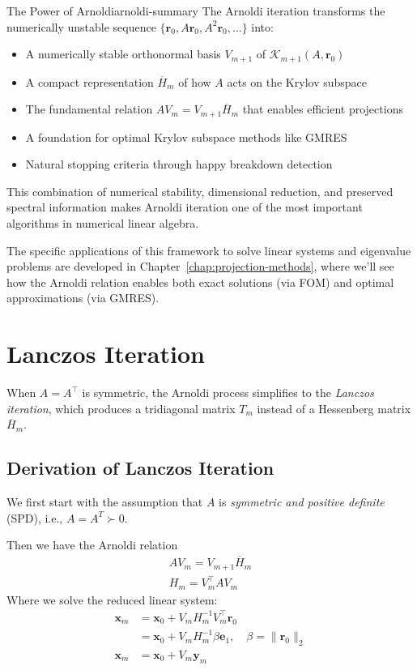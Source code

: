 \begin{summary}{The Power of Arnoldi}{arnoldi-summary}
  The Arnoldi iteration transforms the numerically unstable sequence $\{\mathbf{r}_0, A\mathbf{r}_0, A^2\mathbf{r}_0, \ldots\}$ into:
  \begin{itemize}
    \item A numerically stable orthonormal basis $V_{m+1}$ of $\mathcal{K}_{m+1}(A,\mathbf{r}_0)$
    \item A compact representation $\overline{H}_m$ of how $A$ acts on the Krylov subspace
    \item The fundamental relation $AV_m = V_{m+1}\overline{H}_m$ that enables efficient projections
    \item A foundation for optimal Krylov subspace methods like GMRES
    \item Natural stopping criteria through happy breakdown detection
  \end{itemize}
  This combination of numerical stability, dimensional reduction, and preserved spectral information makes Arnoldi iteration one of the most important algorithms in numerical linear algebra.
\end{summary}

The specific applications of this framework to solve linear systems and eigenvalue problems are developed in Chapter~\ref{chap:projection-methods}, where we'll see how the Arnoldi relation enables both exact solutions (via FOM) and optimal approximations (via GMRES).


\section{Lanczos Iteration}
\label{sec:lanczos-iteration}

When $A=A^\top$ is symmetric, the Arnoldi process simplifies to the \emph{Lanczos iteration}, which produces a tridiagonal matrix $T_m$ instead of a Hessenberg matrix $\overline{H}_m$.

\subsection{Derivation of Lanczos Iteration}
We first start with the assumption that $A$ is \emph{symmetric and positive definite} (SPD), i.e., $A = A^T \succ 0$.

Then we have the Arnoldi relation
\begin{align*}
  AV_m = V_{m+1}\overline{H}_m \\
  H_m = V_m^\top A V_m
\end{align*}
Where we solve the reduced linear system:
\begin{align*}
  \mathbf{x}_m & = \mathbf{x}_0 + V_m H_m^{-1} V_m^\top \mathbf{r}_0                                \\
               & = \mathbf{x}_0 + V_m H_m^{-1} \beta \mathbf{e}_1, \quad \beta = \|\mathbf{r}_0\|_2 \\
  \mathbf{x}_m & = \mathbf{x}_0 + V_m \mathbf{y}_m
\end{align*}

